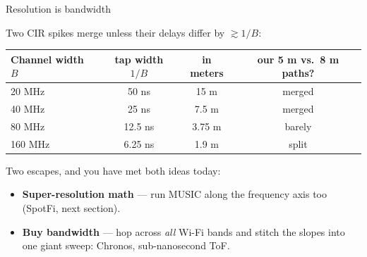 \begin{frame}{Resolution is bandwidth}
  \vspace{0.3em}
  {\small Two CIR spikes merge unless their delays differ by
   $\gtrsim 1/B$:\par}

  \vspace{0.4em}
  \centering
  {\small
  \begin{tabular}{lccc}
    \toprule
    Channel width $B$ & tap width $1/B$ & in meters & our 5 m vs.\ 8 m paths? \\
    \midrule
    20 MHz  & 50 ns   & 15 m   & \textcolor{talkred}{merged} \\
    40 MHz  & 25 ns   & 7.5 m  & \textcolor{talkred}{merged} \\
    80 MHz  & 12.5 ns & 3.75 m & \textcolor{talkred}{barely} \\
    160 MHz & 6.25 ns & 1.9 m  & \textcolor{softgreen}{split} \\
    \bottomrule
  \end{tabular}\par}

  \vspace{0.6em}
  {\small Two escapes, and you have met both ideas today:\par}
  {\small
   \begin{itemize}\itemsep3pt
     \item \textbf{Super-resolution math} --- run MUSIC along the
       \textcolor{coreorange}{frequency axis} too (SpotFi, next section).
     \item \textbf{Buy bandwidth} --- hop across \emph{all} Wi-Fi bands and
       stitch the slopes into one giant sweep: Chronos, sub-nanosecond ToF.
   \end{itemize}\par}

\end{frame}

